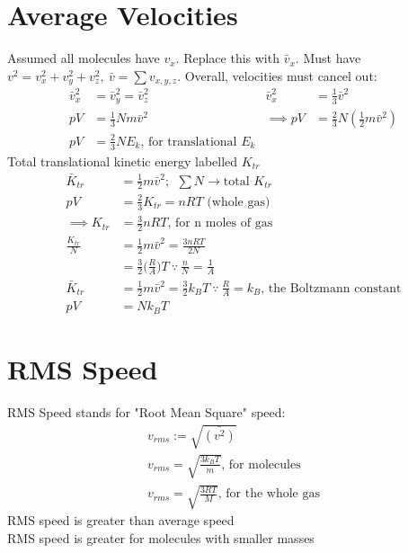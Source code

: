 \documentclass[a4paper, 11pt, normalem]{report}
\begin{document}
\section{Average Velocities}
Assumed all molecules have $v_{x}$.
Replace this with $\bar{v}_{x}$.
Must have $v^{2} = v_{x}^{2} + v_{y}^{2} + v_{z}^{2},~ \bar{v} = \sum v_{x,y,z}$.
Overall, velocities must cancel out:
\begin{align}
    \bar{v}_{x}^{2} &= \bar{v}_{y}^{2} = \bar{v}_{z}^{2} & \bar{v}_{x}^{2} &= \frac{1}{3}\bar{v}^{2} \\
    pV &= \frac{1}{3}Nm\bar{v}^{2} & \implies pV &= \frac{2}{3}N(\frac{1}{2}m\bar{v}^{2}) \\
    pV &= \frac{2}{3}NE_{k} \text{, for translational }E_{k} & 
\end{align}
Total translational kinetic energy labelled $K_{tr}$
\begin{align}
    \bar{K}_{tr} &= \frac{1}{2}m\bar{v}^{2};~~ \sum N \rightarrow \text{total }K_{tr} \\
    pV &= \frac{2}{3}K_{tr} = nRT \text{ (whole gas)} \\
    \implies K_{tr} &= \frac{3}{2}nRT\text{, for n moles of gas} \\
    \frac{K_{tr}}{N} &= \frac{1}{2}m\bar{v}^{2} = \frac{3nRT}{2N} \\
                     &= \frac{3}{2}\Big(\frac{R}{A}\Big)T ~\because~ \frac{n}{N} = \frac{1}{A} \\
    \bar{K}_{tr} &= \frac{1}{2}m\bar{v}^{2} = \frac{3}{2}k_{B}T ~\because~ \frac{R}{A} = k_{B}\text{, the Boltzmann constant} \\
    pV &= Nk_{B}T
\end{align}

\section{RMS Speed}
RMS Speed stands for "Root Mean Square" speed:
\begin{gather*}
	v_{rms} := \sqrt{\bar{(v^{2})}} \\
	v_{rms} = \sqrt{\frac{3k_{B}T}{m}}\text{, for molecules} \\
	v_{rms} = \sqrt{\frac{3RT}{M}}\text{, for the whole gas}
\end{gather*}
RMS speed is greater than average speed \\
RMS speed is greater for molecules with smaller masses
\end{document}
